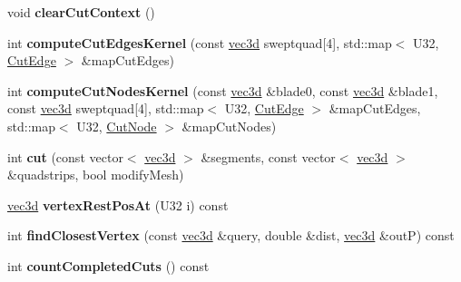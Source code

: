 \begin{DoxyCompactItemize}
\item 
\hypertarget{classps_1_1CuttableMesh_a8d394dc966b3276bf8220bd5a9058acd}{}void {\bfseries clear\+Cut\+Context} ()\label{classps_1_1CuttableMesh_a8d394dc966b3276bf8220bd5a9058acd}

\item 
\hypertarget{classps_1_1CuttableMesh_a0c50266011ed7637ad4abda831919d43}{}int {\bfseries compute\+Cut\+Edges\+Kernel} (const \hyperlink{classps_1_1base_1_1Vec3}{vec3d} sweptquad\mbox{[}4\mbox{]}, std\+::map$<$ U32, \hyperlink{classps_1_1CuttableMesh_1_1CutEdge}{Cut\+Edge} $>$ \&map\+Cut\+Edges)\label{classps_1_1CuttableMesh_a0c50266011ed7637ad4abda831919d43}

\item 
\hypertarget{classps_1_1CuttableMesh_a8fbf505ed7c7071ef1224669c4765a54}{}int {\bfseries compute\+Cut\+Nodes\+Kernel} (const \hyperlink{classps_1_1base_1_1Vec3}{vec3d} \&blade0, const \hyperlink{classps_1_1base_1_1Vec3}{vec3d} \&blade1, const \hyperlink{classps_1_1base_1_1Vec3}{vec3d} sweptquad\mbox{[}4\mbox{]}, std\+::map$<$ U32, \hyperlink{classps_1_1CuttableMesh_1_1CutEdge}{Cut\+Edge} $>$ \&map\+Cut\+Edges, std\+::map$<$ U32, \hyperlink{structps_1_1CuttableMesh_1_1CutNode}{Cut\+Node} $>$ \&map\+Cut\+Nodes)\label{classps_1_1CuttableMesh_a8fbf505ed7c7071ef1224669c4765a54}

\item 
\hypertarget{classps_1_1CuttableMesh_aebb71b94c4889bc626895965caeea560}{}int {\bfseries cut} (const vector$<$ \hyperlink{classps_1_1base_1_1Vec3}{vec3d} $>$ \&segments, const vector$<$ \hyperlink{classps_1_1base_1_1Vec3}{vec3d} $>$ \&quadstrips, bool modify\+Mesh)\label{classps_1_1CuttableMesh_aebb71b94c4889bc626895965caeea560}

\item 
\hypertarget{classps_1_1CuttableMesh_a8300d6e660ec93f702b0d5e8be75df65}{}\hyperlink{classps_1_1base_1_1Vec3}{vec3d} {\bfseries vertex\+Rest\+Pos\+At} (U32 i) const \label{classps_1_1CuttableMesh_a8300d6e660ec93f702b0d5e8be75df65}

\item 
\hypertarget{classps_1_1CuttableMesh_acbda1bf7e9844cda0b7860f49ace337a}{}int {\bfseries find\+Closest\+Vertex} (const \hyperlink{classps_1_1base_1_1Vec3}{vec3d} \&query, double \&dist, \hyperlink{classps_1_1base_1_1Vec3}{vec3d} \&out\+P) const \label{classps_1_1CuttableMesh_acbda1bf7e9844cda0b7860f49ace337a}

\item 
\hypertarget{classps_1_1CuttableMesh_a7dd74f231775e7e66338712865cddd89}{}int {\bfseries count\+Completed\+Cuts} () const \label{classps_1_1CuttableMesh_a7dd74f231775e7e66338712865cddd89}


\end{DoxyCompactItemize}
